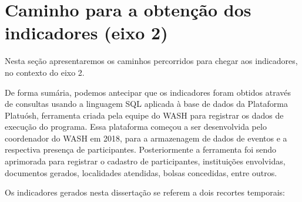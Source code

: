 \documentclass[
12pt,		%
openright,	%
twoside,  %
a4paper,			%
chapter=TITLE,		%
english,			%
french,				%
spanish,			%
brazil				%
]{USPSC-classe/USPSC}
\begin{document}
\section[Caminho para a obten\c{c}\~ao dos indicadores (eixo 2)]{Caminho para a obten\c{c}\~ao dos indicadores (eixo 2)}\label{Caminho para a obten\c{c}\~ao dos indicadores (eixo 2)}
Nesta se\c{c}\~ao apresentaremos os caminhos percorridos para chegar aos indicadores, no contexto do eixo 2.










De forma sum\'aria, podemos antecipar que os indicadores foram obtidos atrav\'es de consultas usando a linguagem SQL aplicada \`a base de dados da Plataforma Platu\'osh, ferramenta criada pela equipe do WASH para registrar os dados de execu\c{c}\~ao do programa. Essa plataforma come\c{c}ou a ser desenvolvida pelo coordenador do WASH em 2018, para a armazenagem de dados de eventos e a respectiva presen\c{c}a de participantes. Posteriormente a ferramenta foi sendo aprimorada para registrar o cadastro de participantes, institui\c{c}\~oes envolvidas, documentos gerados, localidades atendidas, bolsas concedidas, entre outros.










Os indicadores gerados nesta disserta\c{c}\~ao se referem a dois recortes temporais:
\end{document}
